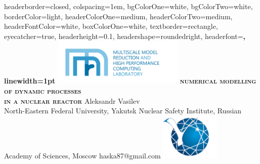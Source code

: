 \documentclass[a1paper,fontscale=0.6]{poster}
\begin{document}
\begin{poster}{
headerborder=closed, %
colspacing=1em, %
bgColorOne=white, %
bgColorTwo=white, %
borderColor=light, %
headerColorOne=medium, %
headerColorTwo=medium, %
headerFontColor=white, %
boxColorOne=white, %
textborder=rectangle, %
eyecatcher=true, %
headerheight=0.1\textheight, %
headershape=roundedright, %
headerfont=\Large\bf\textsc, %
linewidth=1pt %
}
{\includegraphics[height=6em]{mmr-text.png}}
{\bf\textsc{numerical modelling of dynamic processes\\\vspace{0.4em} in a nuclear reactor}}
{\vspace{0.4em}
{Aleksandr Vasilev} \\\vspace{0.4em}
\normalsize{
North-Eastern Federal University, Yakutsk \quad
Nuclear Safety Institute, Russian Academy of Sciences, Moscow \quad
haska87@gmail.com}}
{\includegraphics[height=6em]{logoNEFU.png}}


\end{poster}
\end{document}
